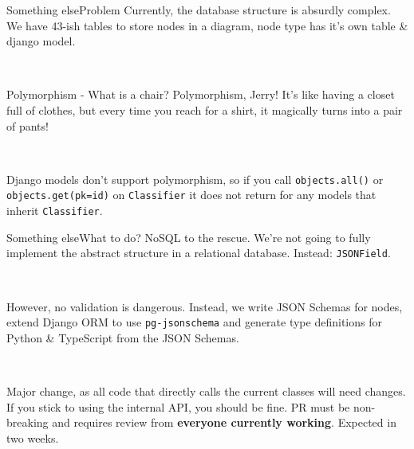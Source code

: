 \documentclass{beamer}
\begin{document}
\begin{frame}{Something else}{Problem}
    Currently, the database structure is absurdly complex.
    We have 43-ish tables to store nodes in a diagram, 
    node type has it's own table \& django model.

    ~

    \begin{exampleblock}{Polymorphism - What is a chair?}
        Polymorphism, Jerry! It's like having a closet 
        full of clothes, but every time you reach for a 
        shirt, it magically turns into a pair of pants!
    \end{exampleblock}
    
    ~

    Django models don't support polymorphism, 
    so if you call \texttt{objects.all()} or 
    \texttt{objects.get(pk={\color{blue}id})} on 
    \texttt{Classifier} it does not return for 
    any models that inherit \texttt{Classifier}.
\end{frame}

\begin{frame}[fragile]{Something else}{What to do?}
    NoSQL to the rescue. We're not going to fully 
    implement the abstract structure in a relational 
    database. Instead: \texttt{JSONField}.

    ~

    However, no validation is {\color{red}dangerous}. Instead,
    we write JSON Schemas for nodes, extend Django ORM to 
    use \texttt{pg-jsonschema} and generate type definitions
    for Python \& TypeScript from the JSON Schemas. 

    ~

    Major change, as all code that directly calls the
    current classes will need changes. If you stick to 
    using the internal API, you should be fine. PR must 
    be non-breaking and requires review from 
    \textbf{everyone currently working}. Expected in two
    weeks.
\end{frame}
\end{document}
